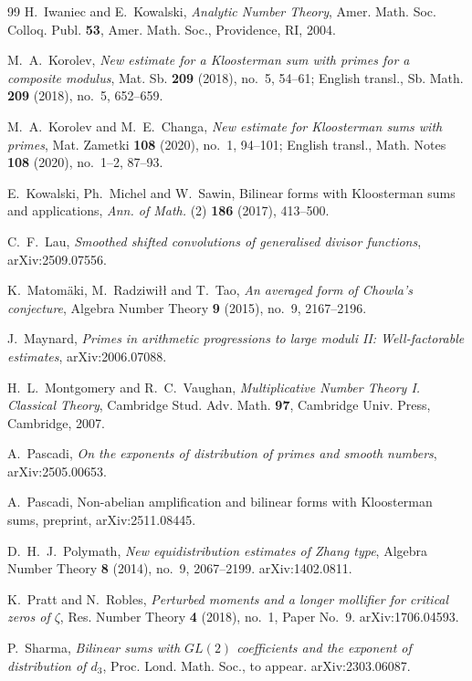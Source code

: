 \documentclass[11pt]{amsart}
\theoremstyle{definition}
\theoremstyle{remark}
\numberwithin{equation}{section}
\begin{document}
\begin{thebibliography}{99}
H.~Iwaniec and E.~Kowalski,
\emph{Analytic Number Theory},
Amer. Math. Soc. Colloq. Publ. \textbf{53}, Amer. Math. Soc., Providence,
RI, 2004.

M.~A.~Korolev,
\emph{New estimate for a Kloosterman sum with primes for a composite
modulus},
Mat. Sb. \textbf{209} (2018), no.~5, 54--61; English transl.,
Sb. Math. \textbf{209} (2018), no.~5, 652--659.

M.~A.~Korolev and M.~E.~Changa,
\emph{New estimate for Kloosterman sums with primes},
Mat. Zametki \textbf{108} (2020), no.~1, 94--101; English transl.,
Math. Notes \textbf{108} (2020), no.~1--2, 87--93.

E.~Kowalski, Ph.~Michel and W.~Sawin,
Bilinear forms with Kloosterman sums and applications,
\emph{Ann. of Math.} (2) \textbf{186} (2017), 413--500.

C.~F.~Lau,
\emph{Smoothed shifted convolutions of generalised divisor functions},
arXiv:2509.07556.

K.~Matom\"aki, M.~Radziwi\l\l{} and T.~Tao,
\emph{An averaged form of Chowla's conjecture},
Algebra Number Theory \textbf{9} (2015), no.~9, 2167--2196.

J.~Maynard,
\emph{Primes in arithmetic progressions to large moduli II: Well-factorable
estimates},
arXiv:2006.07088.

H.~L.~Montgomery and R.~C.~Vaughan,
\emph{Multiplicative Number Theory I. Classical Theory},
Cambridge Stud. Adv. Math. \textbf{97}, Cambridge Univ. Press, Cambridge,
2007.

A.~Pascadi,
\emph{On the exponents of distribution of primes and smooth numbers},
arXiv:2505.00653.

A.~Pascadi,
Non-abelian amplification and bilinear forms with Kloosterman sums,
preprint, arXiv:2511.08445.

D.~H.~J.~Polymath,
\emph{New equidistribution estimates of Zhang type},
Algebra Number Theory \textbf{8} (2014), no.~9, 2067--2199.
arXiv:1402.0811.

K.~Pratt and N.~Robles,
\emph{Perturbed moments and a longer mollifier for critical zeros of
$\zeta$},
Res. Number Theory \textbf{4} (2018), no.~1, Paper No.~9.
arXiv:1706.04593.

P.~Sharma,
\emph{Bilinear sums with $GL(2)$ coefficients and the exponent of
distribution of $d_3$},
Proc. Lond. Math. Soc., to appear.
arXiv:2303.06087.


\end{thebibliography}
\end{document}
